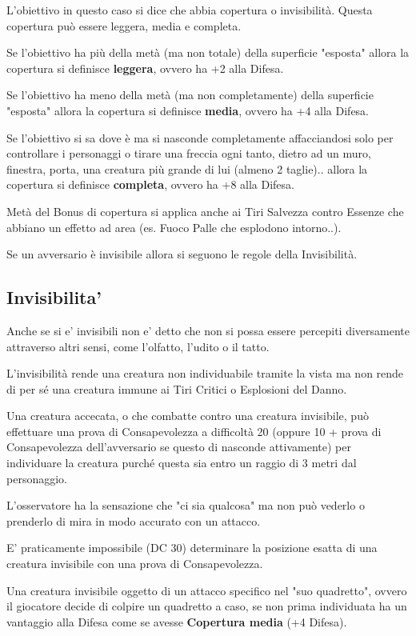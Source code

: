 \documentclass[a4paper,11pt,twoside,openany]{book}
\begin{document}
L'obiettivo in questo caso si dice che abbia copertura o invisibilità. Questa copertura può essere leggera, media e completa.

Se l'obiettivo ha più della metà (ma non totale) della superficie "esposta" allora la copertura si definisce \textbf{leggera}, ovvero ha +2 alla Difesa.

Se l'obiettivo ha meno della metà (ma non completamente) della superficie "esposta" allora la copertura si definisce \textbf{media}, ovvero ha +4 alla Difesa.

Se l'obiettivo si sa dove è ma si nasconde completamente affacciandosi solo per controllare i personaggi o tirare una freccia ogni tanto, dietro ad un muro, finestra, porta, una creatura più grande di lui (almeno 2 taglie).. allora la copertura si definisce \textbf{completa}, ovvero ha +8 alla Difesa.

Metà del Bonus di copertura si applica anche ai Tiri Salvezza contro Essenze che abbiano un effetto ad area (es. Fuoco Palle che esplodono intorno..).

Se un avversario è invisibile allora si seguono le regole della Invisibilità.

\subsection{Invisibilita'}

\label{invisibilita}

Anche se si e' invisibili non e' detto che non si possa essere percepiti diversamente attraverso altri sensi, come l'olfatto, l'udito o il tatto.

L'invisibilità rende una creatura non individuabile tramite la vista ma non rende di per sé una creatura immune ai Tiri Critici o Esplosioni del Danno.

Una creatura accecata, o che combatte contro una creatura invisibile, può effettuare una prova di Consapevolezza a difficoltà 20 (oppure 10 + prova di Consapevolezza dell'avversario se questo di nasconde attivamente) per individuare la creatura purché questa sia entro un raggio di 3 metri dal personaggio.

L'osservatore ha la sensazione che "ci sia qualcosa" ma non può vederlo o prenderlo di mira in modo accurato con un attacco.

E' praticamente impossibile (DC 30) determinare la posizione esatta di una creatura invisibile con una prova di Consapevolezza.

Una creatura invisibile oggetto di un attacco specifico nel "suo quadretto", ovvero il giocatore decide di colpire un quadretto a caso, se non prima individuata ha un vantaggio alla Difesa come se avesse \textbf{Copertura media} (+4 Difesa).
\end{document}
